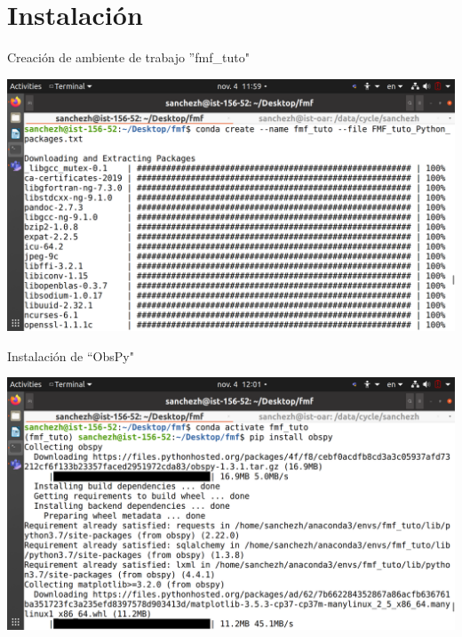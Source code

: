 \documentclass{beamer}
\begin{document}
\section{Instalaci\'on}




\begin{frame}
{Creaci\'on de ambiente de trabajo ''fmf\_tuto"}

 \centering
 \includegraphics[width=1\linewidth]{images/conda_create_fmf.png}
 
\end{frame}

\begin{frame}
 {Instalaci\'on de ``ObsPy"}
 
 \centering
 \includegraphics[width=1\linewidth]{images/conda_activate_fmf_install_obspy.png}
 
\end{frame}
\end{document}
